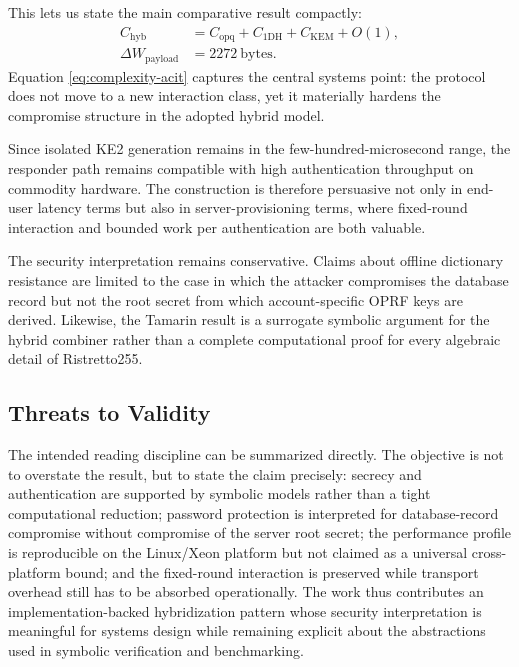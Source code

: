 \documentclass[conference]{IEEEtran}
\begin{document}
This lets us state the main comparative result compactly:
\begin{equation}
\begin{aligned}
C_{\mathrm{hyb}} &= C_{\mathrm{opq}} + C_{\mathrm{1DH}} + C_{\mathrm{KEM}} + O(1), \\
\Delta W_{\mathrm{payload}} &= 2272~\mathrm{bytes}.
\end{aligned}
\label{eq:complexity-acit}
\end{equation}
Equation \eqref{eq:complexity-acit} captures the central systems point: the protocol does not move to a new interaction class, yet it materially hardens the compromise structure in the adopted hybrid model.

Since isolated KE2 generation remains in the few-hundred-microsecond range, the responder path remains compatible with high authentication throughput on commodity hardware. The construction is therefore persuasive not only in end-user latency terms but also in server-provisioning terms, where fixed-round interaction and bounded work per authentication are both valuable.

The security interpretation remains conservative. Claims about offline dictionary resistance are limited to the case in which the attacker compromises the database record but not the root secret from which account-specific OPRF keys are derived. Likewise, the Tamarin result is a surrogate symbolic argument for the hybrid combiner rather than a complete computational proof for every algebraic detail of Ristretto255.

\subsection{Threats to Validity}

The intended reading discipline can be summarized directly. The objective is not to overstate the result, but to state the claim precisely: secrecy and authentication are supported by symbolic models rather than a tight computational reduction; password protection is interpreted for database-record compromise without compromise of the server root secret; the performance profile is reproducible on the Linux/Xeon platform but not claimed as a universal cross-platform bound; and the fixed-round interaction is preserved while transport overhead still has to be absorbed operationally. The work thus contributes an implementation-backed hybridization pattern whose security interpretation is meaningful for systems design while remaining explicit about the abstractions used in symbolic verification and benchmarking.
\end{document}

